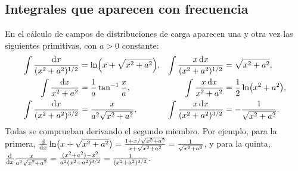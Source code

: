 \subsection{Integrales que aparecen con frecuencia}\label{sec:integrales-frecuentes}
En el cálculo de campos de distribuciones de carga aparecen una y otra vez las
siguientes primitivas, con $a>0$ constante:
\begin{align}
  \int\frac{\mathrm{d} x}{(x^{2}+a^{2})^{1/2}}&=\ln\Bigl(x+\sqrt{x^{2}+a^{2}}\Bigr), &
  \int\frac{x\,\mathrm{d} x}{(x^{2}+a^{2})^{1/2}}&=\sqrt{x^{2}+a^{2}},\label{eq:int-1}\\
  \int\frac{\mathrm{d} x}{x^{2}+a^{2}}&=\frac{1}{a}\tan^{-1}\frac{x}{a}, &
  \int\frac{x\,\mathrm{d} x}{x^{2}+a^{2}}&=\frac{1}{2}\ln\bigl(x^{2}+a^{2}\bigr),\label{eq:int-2}\\
  \int\frac{\mathrm{d} x}{(x^{2}+a^{2})^{3/2}}&=\frac{x}{a^{2}\sqrt{x^{2}+a^{2}}}, &
  \int\frac{x\,\mathrm{d} x}{(x^{2}+a^{2})^{3/2}}&=-\frac{1}{\sqrt{x^{2}+a^{2}}}.\label{eq:int-3}
\end{align}
Todas se comprueban derivando el segundo miembro. Por ejemplo, para la primera,
$\frac{\mathrm{d}}{\mathrm{d} x}\ln\bigl(x+\sqrt{x^{2}+a^{2}}\bigr)=\frac{1+x/\sqrt{x^{2}+a^{2}}}{x+\sqrt{x^{2}+a^{2}}}=\frac{1}{\sqrt{x^{2}+a^{2}}}$,
y para la quinta,
$\frac{\mathrm{d}}{\mathrm{d} x}\frac{x}{a^{2}\sqrt{x^{2}+a^{2}}}=\frac{(x^{2}+a^{2})-x^{2}}{a^{2}(x^{2}+a^{2})^{3/2}}=\frac{1}{(x^{2}+a^{2})^{3/2}}$.

